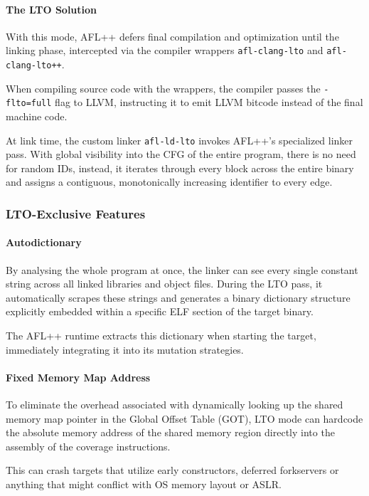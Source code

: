 \paragraph{The LTO Solution} With this mode, AFL++ defers final compilation and optimization until the linking phase, intercepted via the compiler wrappers \texttt{afl-clang-lto} and \texttt{afl-clang-lto++}.

When compiling source code with the wrappers, the compiler passes the \texttt{-flto=full} flag to LLVM, instructing it to emit LLVM bitcode instead of the final machine code.

At link time, the custom linker \texttt{afl-ld-lto} invokes AFL++'s specialized linker pass. With global visibility into the CFG of the entire program, there is no need for random IDs, instead, it iterates through every block across the entire binary and assigns a contiguous, monotonically increasing identifier to every edge.

\subsubsection{LTO-Exclusive Features}

\paragraph{Autodictionary} By analysing the whole program at once, the linker can see every single constant string across all linked libraries and object files. During the LTO pass, it automatically scrapes these strings and generates a binary dictionary structure explicitly embedded within a specific ELF section of the target binary.

The AFL++ runtime extracts this dictionary when starting the target, immediately integrating it into its mutation strategies.

\paragraph{Fixed Memory Map Address} To eliminate the overhead associated with dynamically looking up the shared memory map pointer in the Global Offset Table (GOT), LTO mode can hardcode the absolute memory address of the shared memory region directly into the assembly of the coverage instructions. 

This can crash targets that utilize early constructors, deferred forkservers or anything that might conflict with OS memory layout or ASLR.

